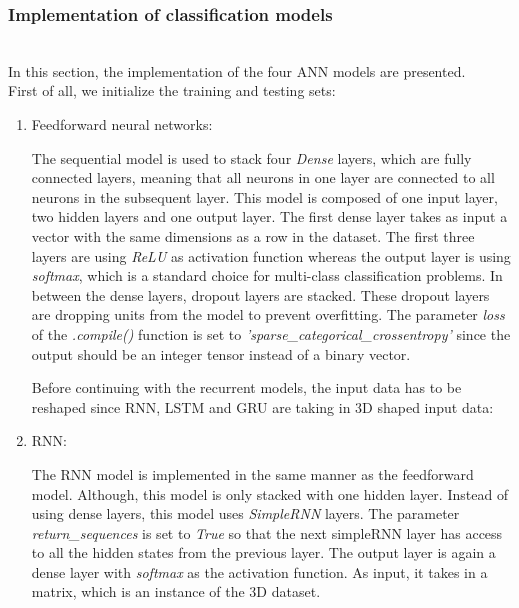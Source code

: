 \subsubsection{Implementation of classification models}\label{implementation}~\\

In this section, the implementation of the four ANN models are presented.\\

First of all, we initialize the training and testing sets:


\begin{enumerate}[label=\arabic*.]
  \item Feedforward neural networks:
    
    The sequential model is used to stack four \textit{Dense} layers, which are
    fully connected layers, meaning that all neurons in one layer are connected
    to all neurons in the subsequent layer. This model is composed of one input
    layer, two hidden layers and one output layer. The first dense layer takes
    as input a vector with the same dimensions as a row in the dataset. The
    first three layers are using \textit{ReLU} as activation function whereas
    the output layer is using \textit{softmax}, which is a standard choice for
    multi-class classification problems. In between the dense layers, dropout
    layers are stacked. These dropout layers are dropping units from the model
    to prevent overfitting. The parameter \textit{loss} of the
    \textit{.compile()} function is set to
    \textit{'sparse\_categorical\_crossentropy'} since the output should be an
    integer tensor instead of a binary vector.\\

  \begin{normalize}
    Before continuing with the recurrent models, the input data has to be
    reshaped since RNN, LSTM and GRU are taking in 3D shaped input data:

    
  \end{normalize}

  \item RNN:
    
    The RNN model is implemented in the same manner as the feedforward model.
    Although, this model is only stacked with one hidden layer.  Instead of
    using dense layers, this model uses \textit{SimpleRNN} layers.  The
    parameter \textit{return\_sequences} is set to \textit{True} so that the
    next simpleRNN layer has access to all the hidden states from the previous
    layer.  The output layer is again a dense layer with \textit{softmax} as the
    activation function. As input, it takes in a matrix, which is an instance of
    the 3D dataset.~\\


\end{enumerate}
